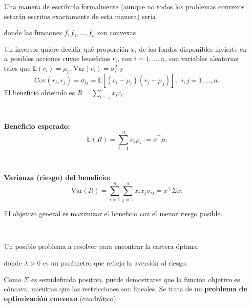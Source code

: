 Una manera de escribirlo formalmente (aunque no todos los problemas convexos estarán escritos exactamente de esta manera) sería
\begin{ioprob}
donde las funciones $f,f_1,\ldots, f_n$ son convexas.
\end{ioprob}


\begin{example}

Un inversor quiere decidir qué proporción  $x_i$ de los fondos disponibles invierte
en $n$ posibles acciones cuyos beneficios $r_i$, con $i=1,\ldots,n$, son variables aleatorias tales que $\mathbb{E}(r_i)=\mu_i$, $\mbox{Var}(r_i)=\sigma^2_i$ y 
\[
\mbox{Cov}(r_i,r_j) = \sigma_{ij} = \mathbb{E}[(r_i-\mu_i)(r_j-\mu_j)], \ \ i,j=1,\ldots, n.
\]
El beneficio obtenido es $R=\sum_{i=1}^n x_ir_i$.


\

\textbf{Beneficio esperado:} 
\[
\mathbb{E}(R)=\sum_{i=1}^n x_i\mu_i := x^\top \mu.
\]

\

\textbf{Varianza (riesgo) del beneficio:}
\[
\mbox{Var}(R) = \sum_{i=1}^n \sum_{j=1}^n x_ix_j\sigma_{ij} = x^\top\Sigma x.
\]

El objetivo general es maximizar el beneficio con el menor riesgo posible.

\

Un posible problema a resolver para encontrar la cartera óptima:
\begin{ioprob}
donde $\lambda>0$ es un parámetro que refleja la aversión al riesgo.
\end{ioprob}

Como $\Sigma$ es semidefinida positiva, puede demostrarse que la función objetivo es cóncava, mientras que las restricciones son lineales. Se trata de un \textbf{problema de optimización convexo} (cuadrático).


\end{example}

